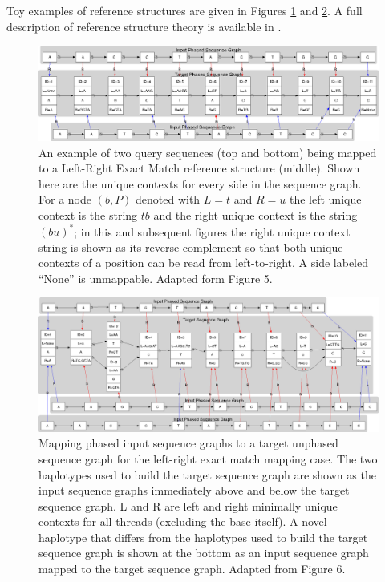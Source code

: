 \documentclass[11pt,proposal]{ucthesis}
\begin{document}
Toy examples of reference structures are given in Figures \ref{fig:lrexactmatch} and \ref{fig:lrexactmatchgraph}. A full description of reference structure theory is available in \cite{paten2014mapping}.

\begin{figure}[ht]
    \centering
    \includegraphics[width=1.0\textwidth]{figures/lrexactmatch.png}
    \caption{An example of two query sequences (top and bottom) being mapped to a Left-Right Exact Match reference structure (middle). Shown here are the unique contexts for every side in the sequence graph. For a node $(b, P)$ denoted with $L=t$ and $R=u$ the left unique context is the string $tb$ and the right unique context is the string $(bu)^*$; in this and subsequent figures the right unique context string is shown as its reverse complement so that both unique contexts of a position can be read from left-to-right. A side labeled ``None'' is unmappable. Adapted form \cite{paten2014mapping} Figure 5.}
    \label{fig:lrexactmatch}
\end{figure}

\begin{figure}[ht]
    \centering
    \includegraphics[width=1.0\textwidth]{figures/lrexactmatchgraph.png}
    \caption{Mapping phased input sequence graphs to a target unphased sequence graph for the left-right exact match mapping case. The two haplotypes used to build the target sequence graph are shown as the input sequence graphs immediately above and below the target sequence graph.  L and R are left and right minimally unique contexts for all threads (excluding the base itself). A novel haplotype that differs from the haplotypes used to build the target sequence graph is shown at the bottom as an input sequence graph mapped to the target sequence graph. Adapted from \cite{paten2014mapping} Figure 6.} 
    \label{fig:lrexactmatchgraph}
\end{figure}
\end{document}
